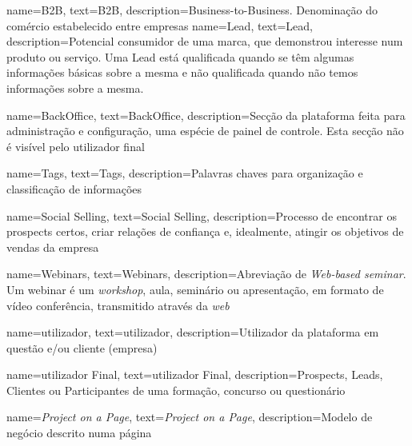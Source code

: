 {
        name=B2B,
        text=B2B,
        description={Business-to-Business. Denominação do comércio estabelecido entre empresas}
}
{
	name=Lead,
	text=Lead,
	description={Potencial consumidor de uma marca, que demonstrou interesse num produto ou serviço. Uma Lead está qualificada quando se têm algumas informações básicas sobre a mesma e não qualificada quando não temos informações sobre a mesma.}
}


{
	name=BackOffice,
	text=BackOffice,
	description={Secção da plataforma feita para administração e configuração, uma espécie de painel de controle. Esta secção não é visível pelo utilizador final}
}

{
	name=Tags,
	text=Tags,
	description={Palavras chaves para organização e classificação de informações}
}

{
	name=Social Selling,
	text=Social Selling,
	description={Processo de encontrar os prospects certos, criar relações de confiança e, idealmente, atingir os objetivos de vendas da empresa}
}

{
	name=Webinars,
	text=Webinars,
	description={Abreviação de \textit{Web-based seminar}. Um webinar é um \textit{workshop}, aula, seminário ou apresentação, em formato de vídeo conferência, transmitido através da \textit{web}}
}

{
	name=utilizador,
	text=utilizador,
	description={Utilizador da plataforma em questão e/ou cliente (empresa)}
}

{
	name=utilizador Final,
	text=utilizador Final,
	description={Prospects, Leads, Clientes ou Participantes de uma formação, concurso ou questionário}
}

{
	name=\textit{Project on a Page},
	text=\textit{Project on a Page},
	description={Modelo de negócio descrito numa página}
}


